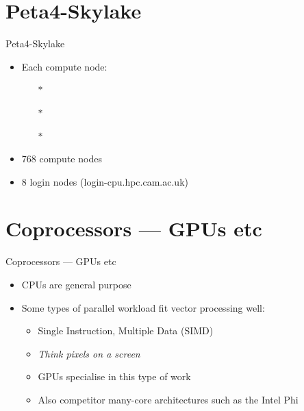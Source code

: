 \section{Peta4-Skylake}
\begin{frame}{Peta4-Skylake}
\begin{itemize}
\item{Each compute node:}
\begin{itemize}
\item[$\ast$]{}
\item[$\ast$]{}
\item[$\ast$]{}
\end{itemize}
\item{768 compute nodes}
\item{8 login nodes (\alert{login-cpu.hpc.cam.ac.uk})}
\end{itemize}
\end{frame}

\section{Coprocessors --- GPUs etc}
\begin{frame}{Coprocessors --- GPUs etc}
  \begin{itemize}
  \item{CPUs are \alert{general purpose}}
    \pause
  \item{Some types of parallel workload fit \alert{vector} processing well:}
    \begin{itemize}
    \item{Single Instruction, Multiple Data (SIMD)}
    \item{\emph{Think pixels on a screen}}\pause
    \item{GPUs specialise in this type of work}\pause
      \item{Also competitor many-core architectures such as the Intel Phi}
    \end{itemize}
\end{itemize}
\end{frame}

